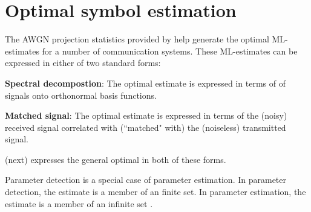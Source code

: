 \section{Optimal symbol estimation}
\label{sec:awgn_est}
The AWGN projection statistics provided by
 help generate the optimal
ML-estimates for a number of communication systems.
These ML-estimates can be expressed in either of two standard forms:
\begin{liste}
  \item {\bf Spectral decompostion}:
     The optimal estimate is expressed in terms of 
     of signals onto orthonormal basis functions.
  \item {\bf Matched signal}:
     The optimal estimate is expressed in terms of the (noisy)
     received signal correlated with (``matched" with)
     the (noiseless) transmitted signal.
\end{liste}
 (next) expresses the general
optimal  in both of these forms.

Parameter detection is a special case of parameter estimation.
In parameter detection, the estimate is a member of an finite set.
In parameter estimation, the estimate is a member of an infinite set
.


